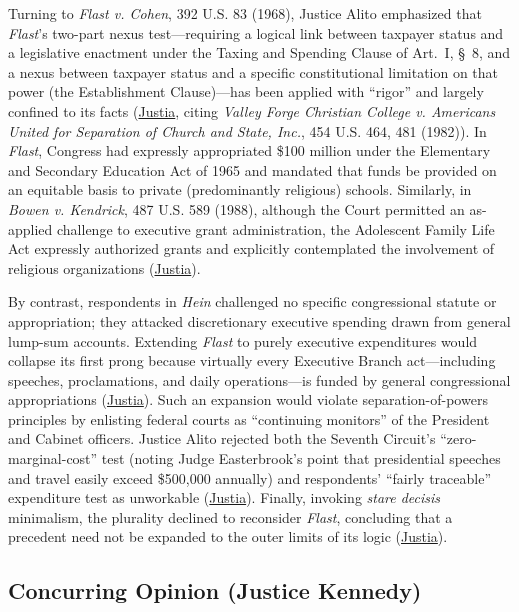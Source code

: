\documentclass[12pt]{article}
\begin{document}
Turning to \textit{Flast v. Cohen}, 392 U.S. 83 (1968), Justice Alito emphasized that \textit{Flast}'s two-part nexus test---requiring a logical link between taxpayer status and a legislative enactment under the Taxing and Spending Clause of Art.~I, \S~8, and a nexus between taxpayer status and a specific constitutional limitation on that power (the Establishment Clause)---has been applied with ``rigor'' and largely confined to its facts (\href{https://supreme.justia.com/cases/federal/us/551/587/}{Justia}, citing \textit{Valley Forge Christian College v. Americans United for Separation of Church and State, Inc.}, 454 U.S. 464, 481 (1982)). In \textit{Flast}, Congress had expressly appropriated \$100 million under the Elementary and Secondary Education Act of 1965 and mandated that funds be provided on an equitable basis to private (predominantly religious) schools. Similarly, in \textit{Bowen v. Kendrick}, 487 U.S. 589 (1988), although the Court permitted an as-applied challenge to executive grant administration, the Adolescent Family Life Act expressly authorized grants and explicitly contemplated the involvement of religious organizations (\href{https://supreme.justia.com/cases/federal/us/551/587/}{Justia}).

By contrast, respondents in \textit{Hein} challenged no specific congressional statute or appropriation; they attacked discretionary executive spending drawn from general lump-sum accounts. Extending \textit{Flast} to purely executive expenditures would collapse its first prong because virtually every Executive Branch act---including speeches, proclamations, and daily operations---is funded by general congressional appropriations (\href{https://supreme.justia.com/cases/federal/us/551/587/}{Justia}). Such an expansion would violate separation-of-powers principles by enlisting federal courts as ``continuing monitors'' of the President and Cabinet officers. Justice Alito rejected both the Seventh Circuit's ``zero-marginal-cost'' test (noting Judge Easterbrook's point that presidential speeches and travel easily exceed \$500,000 annually) and respondents' ``fairly traceable'' expenditure test as unworkable (\href{https://supreme.justia.com/cases/federal/us/551/587/}{Justia}). Finally, invoking \textit{stare decisis} minimalism, the plurality declined to reconsider \textit{Flast}, concluding that a precedent need not be expanded to the outer limits of its logic (\href{https://supreme.justia.com/cases/federal/us/551/587/}{Justia}).

\subsection{Concurring Opinion (Justice Kennedy)}
\end{document}

